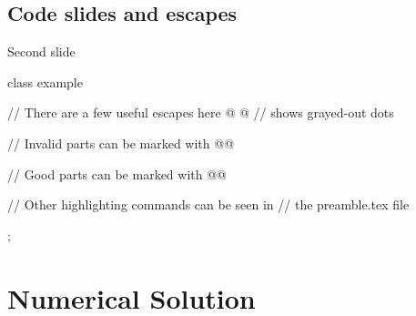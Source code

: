 	\subsection{Code slides and escapes}
	
		\begin{xframe}{Second slide}
		
		    \begin{cxxcode}
		        class example {
		            // There are a few useful escapes here
		            @ \codedots @ // \codedots shows grayed-out dots
		
		            // Invalid parts can be marked with \hlErr
		            @@
		
		            // Good parts can be marked with \hlOk
		            @@
		
		            // Other highlighting commands can be seen in
		            // the preamble.tex file
		        };
		    \end{cxxcode}
		
		\end{xframe}
	
\section{Numerical Solution}


